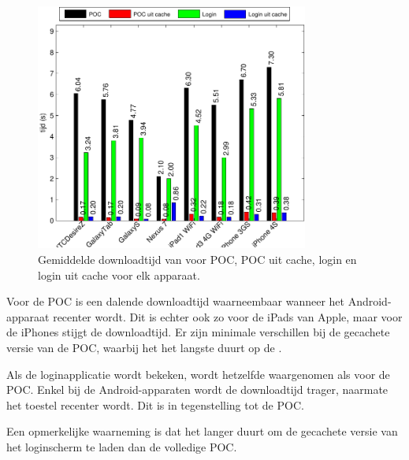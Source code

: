 \begin{figure}
  \centering
  \includegraphics[width=0.8\textwidth]{figuren/performance-jquery.pdf}
  \caption{Gemiddelde downloadtijd van \jqm{} voor POC,  POC uit cache, login en login uit cache voor elk apparaat.}
  \label{fig:performantie-jqm}
\end{figure}

Voor de POC is een dalende downloadtijd waarneembaar wanneer het Android-apparaat recenter wordt.
Dit is echter ook zo voor de iPads van Apple, maar voor de iPhones stijgt de downloadtijd.
Er zijn minimale verschillen bij de gecachete versie van de POC, waarbij het het langste duurt op de \ipadi{}.

Als de loginapplicatie wordt bekeken, wordt hetzelfde waargenomen als voor de POC.
Enkel bij de Android-apparaten wordt de downloadtijd trager, naarmate het toestel recenter wordt.
Dit is in tegenstelling tot de POC.

Een opmerkelijke waarneming is dat het langer duurt om de gecachete versie van het loginscherm te laden dan de volledige POC.


\section{\lungo}
\label{sec:app-performantie-lungo}

